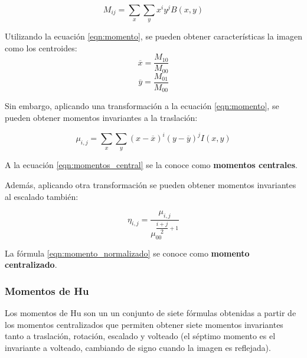 \begin{equation}
	\label{eqn:momento}
	M_{ij} = \sum_{x}^{} \sum_{y}^{} x^{i} y^{j} B(x,y)
\end{equation}

Utilizando la ecuación \ref{eqn:momento}, se pueden obtener características la imagen como los centroides:
\begin{equation}
	\label{eqn:momentos_x_centroide}
	\overline{x} = \dfrac{M_{10}}{M_{00}}
\end{equation}
\begin{equation}
	\label{eqn:momentos_y_centroide}
	\overline{y} = \dfrac{M_{01}}{M_{00}}
\end{equation}

Sin embargo, aplicando una transformación a la ecuación \ref{eqn:momento}, se pueden obtener momentos invariantes a la traslación:

\begin{equation}
	\label{eqn:momentos_central}
	\mu_{i,j} = \sum_{x} \sum_{y} (x-\overline{x})^{i} (y-\overline{y})^{j} I(x,y)
\end{equation}

A la ecuación \ref{eqn:momentos_central} se la conoce como \textbf{momentos centrales}.

Además, aplicando otra transformación se pueden obtener momentos invariantes al escalado también:

\begin{equation}
	\label{eqn:momento_normalizado}
	\eta_{i,j} = \dfrac{\mu_{i,j}}{\mu_{00}^{\dfrac{i+j}{2}+1}}
\end{equation}

La fórmula \ref{eqn:momento_normalizado} se conoce como \textbf{momento centralizado}.

\subsubsection{Momentos de Hu}

Los momentos de Hu \cite{1057692} son un un conjunto de siete fórmulas obtenidas a partir de los momentos centralizados que permiten obtener siete momentos invariantes tanto a traslación, rotación, escalado y volteado (el séptimo momento es el invariante a volteado, cambiando de signo cuando la imagen es reflejada).


